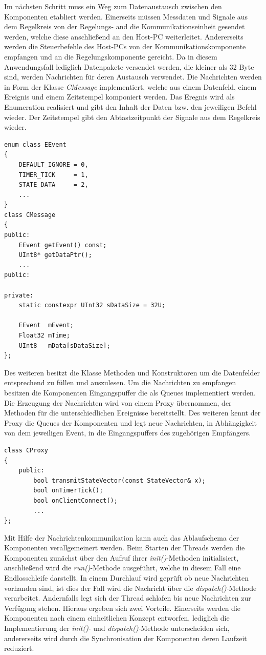 Im nächsten Schritt muss ein Weg zum Datenaustausch zwischen den Komponenten etabliert werden. Einerseits müssen Messdaten und Signale aus dem Regelkreis von der Regelungs- and die Kommunikationseinheit gesendet werden, welche diese anschließend an den Host-PC weiterleitet. Andererseits werden die Steuerbefehle des Host-PCs von der Kommunikationskomponente empfangen und an die Regelungskomponente gereicht. Da in diesem Anwendungsfall lediglich Datenpakete versendet werden, die kleiner als 32 Byte sind, werden Nachrichten für deren Austausch verwendet. Die Nachrichten werden in Form der Klasse \textit{CMessage} implementiert, welche aus einem Datenfeld, einem Ereignis und einem Zeitstempel komponiert werden. Das Eregnis wird als Enumeration realisiert und gibt den Inhalt der Daten bzw. den jeweiligen Befehl wieder. Der Zeitstempel gibt den Abtastzeitpunkt der Signale aus dem Regelkreis wieder. 
\begin{lstlisting}[caption={Implementierung der Events und Nachrichten},captionpos=b]
enum class EEvent
{
	DEFAULT_IGNORE = 0,
	TIMER_TICK     = 1,
	STATE_DATA     = 2,
	...
}
class CMessage
{
public:
	EEvent getEvent() const;
	UInt8* getDataPtr();
	...
public:

private:
	static constexpr UInt32 sDataSize = 32U;

	EEvent  mEvent;
	Float32 mTime;	
	UInt8   mData[sDataSize];
};
\end{lstlisting}
Des weiteren besitzt die Klasse Methoden und Konstruktoren um die Datenfelder entsprechend zu füllen und auszulesen. Um die Nachrichten zu empfangen besitzen die Komponenten Eingangspuffer die als Queues implementiert werden. Die Erzeugung der Nachrichten wird von einem Proxy übernommen, der Methoden für die unterschiedlichen Ereignisse bereitstellt. Des weiteren kennt der Proxy die Queues der Komponenten und legt neue Nachrichten, in Abhängigkeit von dem jeweiligen Event, in die Eingangspuffers des zugehörigen Empfängers.
\begin{lstlisting}[caption={Beispielhafte Implementierung des Proxys},captionpos=b]
class CProxy
{
	public:
		bool transmitStateVector(const StateVector& x);
		bool onTimerTick();
		bool onClientConnect();
		...
};
\end{lstlisting}
Mit Hilfe der Nachrichtenkommunikation kann auch das Ablaufschema der Komponenten verallgemeinert werden. Beim Starten der Threads werden die Komponenten zunächst über den Aufruf ihrer \textit{init()}-Methoden initialisiert, anschließend wird die \textit{run()}-Methode ausgeführt, welche in diesem Fall eine Endlosschleife darstellt. In einem Durchlauf wird geprüft ob neue Nachrichten vorhanden sind, ist dies der Fall wird die Nachricht über die \textit{dispatch()}-Methode verarbeitet. Andernfalls legt sich der Thread schlafen bis neue Nachrichten zur Verfügung stehen. Hieraus ergeben sich zwei Vorteile. Einerseits werden die Komponenten nach einem einheitlichen Konzept entworfen, lediglich die Implementierung der \textit{init()}- und \textit{dispatch()}-Methode unterscheiden sich, andererseits wird durch die Synchronisation der Komponenten deren Laufzeit reduziert.